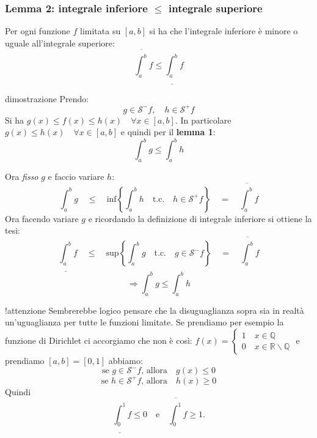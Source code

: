 \documentclass[x11names]{article}
\begin{document}
	\begin{center}
		\colorbox{myred}{\begin{minipage}{5.75in}
				\begin{redes}{}
					\subsubsection{Lemma 2: integrale inferiore $\leq$ integrale superiore}
					Per ogni funzione $f$ limitata su $\left[a,b\right]$ si ha che l'integrale inferiore è minore o uguale all'integrale superiore:
					\[
					\overline{\int_{a}^{b}}f \leq \underline{\int_{a}^{b}}f
					\]
				\end{redes}
		\end{minipage}}        
	\end{center}
	\begin{es}{dimostrazione}
		Prendo:
		\[
		g \in \mathcal{S}^-f, \quad h \in \mathcal{S}^+f
		\]
		Si ha $g(x) \leq f(x) \leq h(x) \quad \forall x \in [a,b]$. In particolare $g(x) \leq h(x) \quad \forall x \in [a,b]$ e quindi per il \textbf{lemma 1}:
		\[
		\int_{a}^{b}g \leq \int_{a}^{b}h 
		\]
		
		Ora \textit{fisso} $g$ e faccio variare $h$:
		\[
		\int_{a}^{b}g \quad \leq \quad \text{inf}\left\{\int_{a}^{b}h \quad \text{t.c.} \quad h \in \mathcal{S}^+f\right\} \quad = \quad \overline{\int_{a}^{b}}f
		\]
		Ora facendo variare $g$ e ricordando la definizione di integrale inferiore si ottiene la tesi:
		\[
		\underline{\int_{a}^{b}}f \quad \leq \quad \text{sup}\left\{\int_{a}^{b}g \quad \text{t.c.} \quad g \in \mathcal{S}^-f\right\} \quad = \quad \overline{\int_{a}^{b}}f
		\]
		\[
		\Longrightarrow 	\int_{a}^{b}g \leq \int_{a}^{b}h 
		\]
		\end{es}
	\begin{es}{}
		\begin{es}{!attenzione}
			Sembrerebbe logico pensare che la disuguaglianza sopra sia in realtà un'uguaglianza per tutte le funzioni limitate.
			Se prendiamo per esempio la funzione di Dirichlet ci accorgiamo che non è così: $f(x) = \begin{cases}
				1 \quad x \in \mathbb{Q} \\
				0 \quad x \in \mathbb{R} \backslash \mathbb{Q}
			\end{cases}$
			e prendiamo $[a,b] = [0,1]$ abbiamo:
			\[
			\text{se } g \in \mathcal{S}^-f \text{, allora} \quad g(x) \leq 0
			\]
			\[
			\text{se } h \in \mathcal{S}^+f \text{, allora} \quad h(x) \geq 0
			\]
			Quindi 
			\[
			\underline{\int_{0}^{1}}f \leq 0 \quad \text{e} \quad \overline{\int_{0}^{1}}f \geq 1.
			\]
		\end{es}
	\end{es}
	
\end{document}

